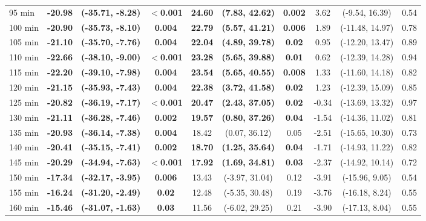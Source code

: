 \begin{table}[ht]
{\begin{tabular}{lccccccccc}
95 min & \textbf{-20.98} & \textbf{(-35.71, -8.28)} & \textbf{$<$0.001} & \textbf{24.60} & \textbf{(7.83, 42.62)} & \textbf{0.002} & 3.62 & (-9.54, 16.39) & 0.54 \\
100 min & \textbf{-20.90} & \textbf{(-35.73, -8.10)} & \textbf{0.004} & \textbf{22.79} & \textbf{(5.57, 41.21)} & \textbf{0.006} & 1.89 & (-11.48, 14.97) & 0.78 \\
105 min & \textbf{-21.10} & \textbf{(-35.70, -7.76)} & \textbf{0.004} & \textbf{22.04} & \textbf{(4.89, 39.78)} & \textbf{0.02} & 0.95 & (-12.20, 13.47) & 0.89 \\
110 min & \textbf{-22.66} & \textbf{(-38.10, -9.00)} & \textbf{$<$0.001} & \textbf{23.28} & \textbf{(5.65, 39.88)} & \textbf{0.01} & 0.62 & (-12.39, 14.28) & 0.94 \\
115 min & \textbf{-22.20} & \textbf{(-39.10, -7.98)} & \textbf{0.004} & \textbf{23.54} & \textbf{(5.65, 40.55)} & \textbf{0.008} & 1.33 & (-11.60, 14.18) & 0.82 \\
120 min & \textbf{-21.15} & \textbf{(-35.93, -7.43)} & \textbf{0.004} & \textbf{22.38} & \textbf{(3.72, 41.58)} & \textbf{0.02} & 1.23 & (-12.39, 15.09) & 0.85 \\
125 min & \textbf{-20.82} & \textbf{(-36.19, -7.17)} & \textbf{$<$0.001} & \textbf{20.47} & \textbf{(2.43, 37.05)} & \textbf{0.02} & -0.34 & (-13.69, 13.32) & 0.97 \\
130 min & \textbf{-21.11} & \textbf{(-36.28, -7.46)} & \textbf{0.002} & \textbf{19.57} & \textbf{(0.80, 37.26)} & \textbf{0.04} & -1.54 & (-14.36, 11.02) & 0.81 \\
135 min & \textbf{-20.93} & \textbf{(-36.14, -7.38)} & \textbf{0.004} & 18.42 & (0.07, 36.12) & 0.05 & -2.51 & (-15.65, 10.30) & 0.73 \\
140 min & \textbf{-20.41} & \textbf{(-35.15, -7.41)} & \textbf{0.002} & \textbf{18.70} & \textbf{(1.25, 35.64)} & \textbf{0.04} & -1.71 & (-14.93, 11.22) & 0.82 \\
145 min & \textbf{-20.29} & \textbf{(-34.94, -7.63)} & \textbf{$<$0.001} & \textbf{17.92} & \textbf{(1.69, 34.81)} & \textbf{0.03} & -2.37 & (-14.92, 10.14) & 0.72 \\
150 min & \textbf{-17.34} & \textbf{(-32.17, -3.95)} & \textbf{0.006} & 13.43 & (-3.97, 31.04) & 0.12 & -3.91 & (-15.96, 9.05) & 0.54 \\
155 min & \textbf{-16.24} & \textbf{(-31.20, -2.49)} & \textbf{0.02} & 12.48 & (-5.35, 30.48) & 0.19 & -3.76 & (-16.18, 8.24) & 0.55 \\
160 min & \textbf{-15.46} & \textbf{(-31.07, -1.63)} & \textbf{0.03} & 11.56 & (-6.02, 29.25) & 0.21 & -3.90 & (-17.13, 8.04) & 0.55 \\

\end{tabular}}
\end{table}
